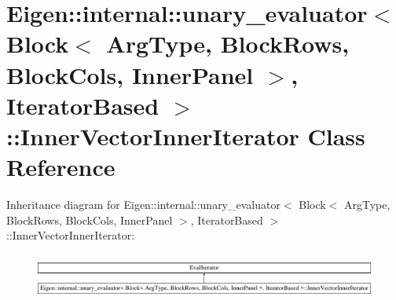\hypertarget{class_eigen_1_1internal_1_1unary__evaluator_3_01_block_3_01_arg_type_00_01_block_rows_00_01_bloc7b8c3454e32b582bbd24168a4ea19a1b}{}\section{Eigen\+::internal\+::unary\+\_\+evaluator$<$ Block$<$ Arg\+Type, Block\+Rows, Block\+Cols, Inner\+Panel $>$, Iterator\+Based $>$\+::Inner\+Vector\+Inner\+Iterator Class Reference}
\label{class_eigen_1_1internal_1_1unary__evaluator_3_01_block_3_01_arg_type_00_01_block_rows_00_01_bloc7b8c3454e32b582bbd24168a4ea19a1b}
Inheritance diagram for Eigen\+::internal\+::unary\+\_\+evaluator$<$ Block$<$ Arg\+Type, Block\+Rows, Block\+Cols, Inner\+Panel $>$, Iterator\+Based $>$\+::Inner\+Vector\+Inner\+Iterator\+:\begin{figure}[H]
\begin{center}
\leavevmode
\includegraphics[height=1.477572cm]{class_eigen_1_1internal_1_1unary__evaluator_3_01_block_3_01_arg_type_00_01_block_rows_00_01_bloc7b8c3454e32b582bbd24168a4ea19a1b}
\end{center}
\end{figure}
